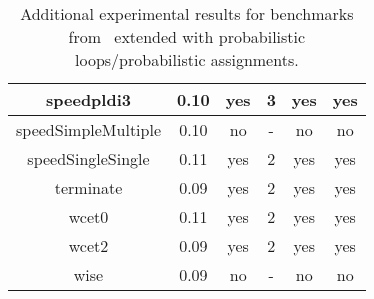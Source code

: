 \begin{center}
\begin{table}[]
\begin{tabular}{c|c|c|c|c|c}
{speedpldi3} & {0.10} & {yes} & {3} & {yes} & {yes} \\\hline
{speedSimpleMultiple} & {0.10} & {no} & {-} & {no} & {no} \\\hline
{speedSingleSingle} & {0.11} & {yes} & {2} & {yes} & {yes} \\\hline
{terminate} & {0.09} & {yes} & {2} & {yes} & {yes} \\\hline
{wcet0} & {0.11} & {yes} & {2} & {yes} & {yes} \\\hline
{wcet2} & {0.09} & {yes} & {2} & {yes} & {yes} \\\hline
{wise} & {0.09} & {no} & {-} & {no} & {no} \\\hline
    \end{tabular}
    \caption{Additional experimental results for benchmarks 
    from~\cite{ADFG10:lexicographic} extended with probabilistic 
    loops/probabilistic assignments.}
    \label{tab:exp3}
\end{table}
\end{center}


